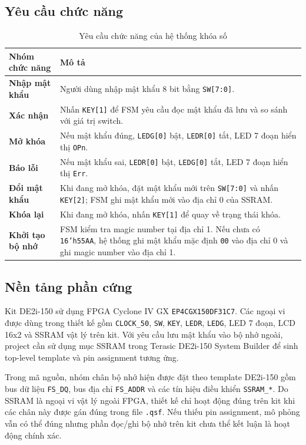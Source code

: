 \documentclass[13pt,a4paper]{article}
\begin{document}
\subsection{Yêu cầu chức năng}
\begin{table}[H]
\centering
\caption{Yêu cầu chức năng của hệ thống khóa số}
\label{tab:req}
\begin{tabularx}{\textwidth}{|>{\bfseries}p{3.6cm}|X|}
\hline
\textbf{Nhóm chức năng} & \textbf{Mô tả}\\
\hline
Nhập mật khẩu & Người dùng nhập mật khẩu 8 bit bằng \texttt{SW[7:0]}.\\
\hline
Xác nhận & Nhấn \texttt{KEY[1]} để FSM yêu cầu đọc mật khẩu đã lưu và so sánh với giá trị switch.\\
\hline
Mở khóa & Nếu mật khẩu đúng, \texttt{LEDG[0]} bật, \texttt{LEDR[0]} tắt, LED 7 đoạn hiển thị \texttt{OPn}.\\
\hline
Báo lỗi & Nếu mật khẩu sai, \texttt{LEDR[0]} bật, \texttt{LEDG[0]} tắt, LED 7 đoạn hiển thị \texttt{Err}.\\
\hline
Đổi mật khẩu & Khi đang mở khóa, đặt mật khẩu mới trên \texttt{SW[7:0]} và nhấn \texttt{KEY[2]}; FSM ghi mật khẩu mới vào địa chỉ 0 của SSRAM.\\
\hline
Khóa lại & Khi đang mở khóa, nhấn \texttt{KEY[1]} để quay về trạng thái khóa.\\
\hline
Khởi tạo bộ nhớ & FSM kiểm tra magic number tại địa chỉ 1. Nếu chưa có \texttt{16'h55AA}, hệ thống ghi mật khẩu mặc định \texttt{00} vào địa chỉ 0 và ghi magic number vào địa chỉ 1.\\
\hline
\end{tabularx}
\end{table}

\subsection{Nền tảng phần cứng}
Kit DE2i-150 sử dụng FPGA Cyclone IV GX \texttt{EP4CGX150DF31C7}. Các ngoại vi được dùng trong thiết kế gồm \texttt{CLOCK\_50}, \texttt{SW}, \texttt{KEY}, \texttt{LEDR}, \texttt{LEDG}, LED 7 đoạn, LCD 16x2 và SSRAM vật lý trên kit. Với yêu cầu lưu mật khẩu vào bộ nhớ ngoài, project cần sử dụng mục SSRAM trong Terasic DE2i-150 System Builder để sinh top-level template và pin assignment tương ứng.

Trong mã nguồn, nhóm chân bộ nhớ hiện được đặt theo template DE2i-150 gồm bus dữ liệu \texttt{FS\_DQ}, bus địa chỉ \texttt{FS\_ADDR} và các tín hiệu điều khiển \texttt{SSRAM\_*}. Do SSRAM là ngoại vi vật lý ngoài FPGA, thiết kế chỉ hoạt động đúng trên kit khi các chân này được gán đúng trong file \texttt{.qsf}. Nếu thiếu pin assignment, mô phỏng vẫn có thể đúng nhưng phần đọc/ghi bộ nhớ trên kit chưa thể kết luận là hoạt động chính xác.
\end{document}
